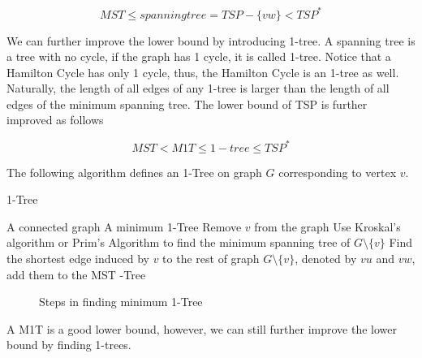             \begin{equation*}
                MST \le spanning tree = TSP - \{vw\} < TSP^*
            \end{equation*}

            We can further improve the lower bound by introducing 1-tree. A spanning tree is a tree with no cycle, if the graph has 1 cycle, it is called 1-tree. Notice that a Hamilton Cycle has only 1 cycle, thus, the Hamilton Cycle is an 1-tree as well. Naturally, the length of all edges of any 1-tree is larger than the length of all edges of the minimum spanning tree. The lower bound of TSP is further improved as follows

            \begin{equation*}
                MST < M1T \le 1-tree \le TSP^*
            \end{equation*}

            The following algorithm defines an 1-Tree on graph $G$ corresponding to vertex $v$.

            \begin{algorithm}
                \caption{1-Tree}
                \begin{algorithmic}
                    \Require A connected graph
                    \Ensure A minimum 1-Tree
                    \State Remove $v$ from the graph
                    \State Use Kroskal's algorithm or Prim's Algorithm to find the minimum spanning tree of $G \setminus \{v\}$
                    \State Find the shortest edge induced by $v$ to the rest of graph $G \setminus \{v\}$, denoted by $vu$ and $vw$, add them to the MST
                    \State {}-Tree
                \end{algorithmic}
            \end{algorithm}

            \begin{figure}[!htp]
                \centering                
                \quad
                \quad
                \caption{Steps in finding minimum 1-Tree}
                \label{fig:1tree}
            \end{figure}

            A M1T is a good lower bound, however, we can still further improve the lower bound by finding 1-trees.

